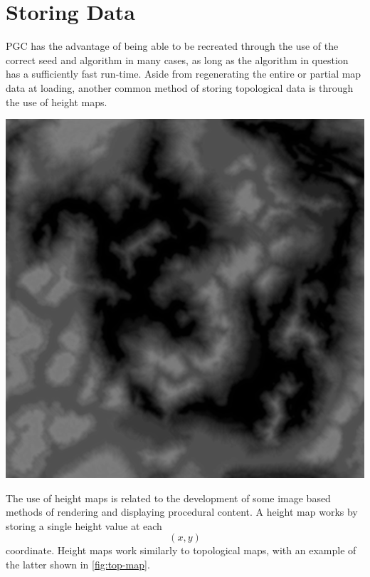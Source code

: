 \documentclass[10pt]{report}
\begin{document}
	\vspace{10pt}
	\let\clearpage\relax
	\chapter{Storing Data} \label{chap:storing_data}
	
		PGC has the advantage of being able to be recreated through the use of the correct seed and algorithm in many cases, as long as the algorithm in question has a sufficiently fast run-time. Aside from regenerating the entire or partial map data at loading, another common method of storing topological data is through the use of height maps. 
		
		\begin{minipage}{\textwidth}
			\centering
			\includegraphics[scale=.5]{D10}
			\label{fig:height-map}
		\end{minipage}
		
		The use of height maps is related to the development of some image based methods of rendering and displaying procedural content. A height map works by storing a single height value at each \[(x,y)\] coordinate. Height maps work similarly to topological maps, with an example of the latter shown in \autoref{fig:top-map}.
		
\end{document}
